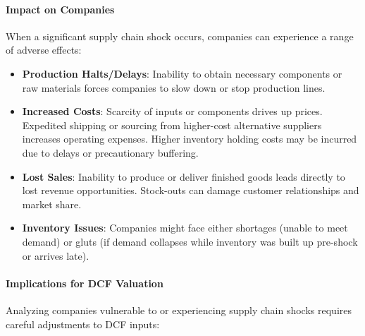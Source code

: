 \paragraph{Impact on Companies}
When a significant supply chain shock occurs, companies can experience a range of adverse effects:
\begin{itemize}
    \item \textbf{Production Halts/Delays}: Inability to obtain necessary components or raw materials forces companies to slow down or stop production lines.
    \item \textbf{Increased Costs}: Scarcity of inputs or components drives up prices. Expedited shipping or sourcing from higher-cost alternative suppliers increases operating expenses. Higher inventory holding costs may be incurred due to delays or precautionary buffering.
    \item \textbf{Lost Sales}: Inability to produce or deliver finished goods leads directly to lost revenue opportunities. Stock-outs can damage customer relationships and market share.
    \item \textbf{Inventory Issues}: Companies might face either shortages (unable to meet demand) or gluts (if demand collapses while inventory was built up pre-shock or arrives late).
\end{itemize}

\paragraph{Implications for DCF Valuation}
Analyzing companies vulnerable to or experiencing supply chain shocks requires careful adjustments to DCF inputs:

